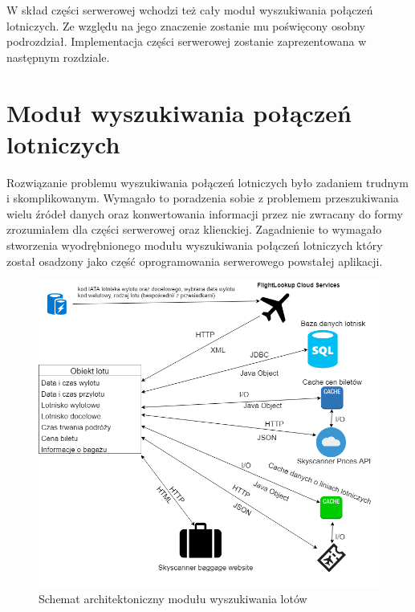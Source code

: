 \documentclass[12pt, twoside]{report}
\begin{document}
W skład części serwerowej wchodzi też cały moduł wyszukiwania połączeń lotniczych. Ze względu na jego znaczenie zostanie mu poświęcony osobny podrozdział. Implementacja części serwerowej  zostanie zaprezentowana w następnym rozdziale.
\newpage
\section{Moduł wyszukiwania połączeń lotniczych}
Rozwiązanie problemu wyszukiwania połączeń lotniczych było zadaniem trudnym i skomplikowanym. Wymagało to poradzenia sobie z problemem przeszukiwania wielu źródeł danych oraz konwertowania informacji przez nie zwracany do formy zrozumiałem dla części serwerowej oraz klienckiej. Zagadnienie to wymagało stworzenia wyodrębnionego modułu wyszukiwania połączeń lotniczych który został osadzony jako część oprogramowania serwerowego powstałej aplikacji.

\begin{figure}[!ht]
\centering
\includegraphics[scale=0.50, keepaspectratio]{search_module.png}
\caption{Schemat architektoniczny modułu wyszukiwania lotów}
\label{fig:search_module}
\end{figure}
\end{document}
